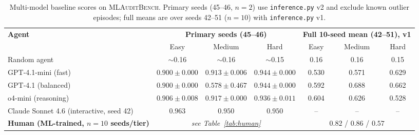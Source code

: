 \documentclass{article}
\begin{document}
\begin{table}[h]
\centering
\caption{Multi-model baseline scores on \textsc{MLAuditBench}.  Primary
seeds (45--46, $n{=}2$) use \texttt{inference.py} v2 and exclude
known outlier episodes; full means are over seeds 42--51 ($n{=}10$)
with \texttt{inference.py} v1.}
\label{tab:baseline}
\small
\begin{tabular}{lcccccc}
\toprule
\multirow{2}{*}{\textbf{Agent}} & \multicolumn{3}{c}{\textbf{Primary seeds (45--46)}} & \multicolumn{3}{c}{\textbf{Full 10-seed mean (42--51), v1}}\\
\cmidrule(lr){2-4}\cmidrule(lr){5-7}
& Easy & Medium & Hard & Easy & Medium & Hard \\
\midrule
Random agent                       & $\sim$0.16 & $\sim$0.16 & $\sim$0.15 & 0.16 & 0.16 & 0.15 \\
GPT-4.1-mini (fast)                & $0.900\pm0.000$ & $0.913\pm0.006$ & $0.944\pm0.000$ & 0.530 & 0.571 & 0.629 \\
GPT-4.1 (balanced)                 & $0.900\pm0.000$ & $0.578\pm0.467$ & $0.944\pm0.000$ & 0.592 & 0.688 & 0.662 \\
o4-mini (reasoning)                & $0.906\pm0.008$ & $0.917\pm0.000$ & $0.936\pm0.011$ & 0.604 & 0.626 & 0.528 \\
Claude Sonnet 4.6 (interactive, seed 42) & $0.963$ & $0.950$ & $0.950$ & -- & -- & -- \\
\textbf{Human (ML-trained, $n{=}10$ seeds/tier)} & \multicolumn{3}{c}{\textit{see Table~\ref{tab:human}}} & \multicolumn{3}{c}{$0.82$ / $0.86$ / $0.57$} \\
\bottomrule
\end{tabular}
\end{table}
\end{document}
